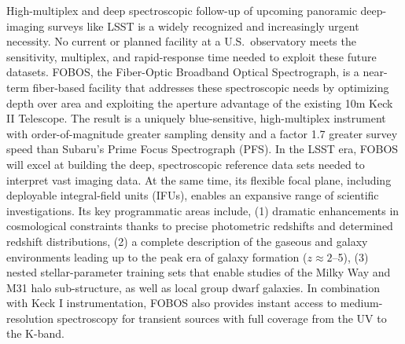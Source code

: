 \documentclass[oneside,12pt]{amsart}
\begin{document}
\noindent High-multiplex and deep spectroscopic follow-up of upcoming
panoramic deep-imaging surveys like LSST is a widely recognized and
increasingly urgent necessity. No current or planned facility at a
U.S.~observatory meets the sensitivity, multiplex, and rapid-response
time needed to exploit these future datasets. FOBOS, the Fiber-Optic
Broadband Optical Spectrograph, is a near-term fiber-based facility that
addresses these spectroscopic needs by optimizing depth over area and
exploiting the aperture advantage of the existing 10m Keck II Telescope.
The result is a uniquely blue-sensitive, high-multiplex instrument with
order-of-magnitude greater sampling density and a factor 1.7 greater
survey speed than Subaru's Prime Focus Spectrograph (PFS). In the LSST
era, FOBOS will excel at building the deep, spectroscopic reference data
sets needed to interpret vast imaging data. At the same time, its
flexible focal plane, including deployable integral-field units (IFUs),
enables an expansive range of scientific investigations. Its key
programmatic areas include, (1) dramatic enhancements in cosmological
constraints thanks to precise photometric redshifts and determined
redshift distributions, (2) a complete description of the gaseous and
galaxy environments leading up to the peak era of galaxy formation ($z
\approx 2$--5), (3) nested stellar-parameter training sets that enable
studies of the Milky Way and M31 halo sub-structure, as well as local group dwarf galaxies.  In combination with Keck I
instrumentation, FOBOS also provides instant access to medium-resolution spectroscopy for transient sources with full
coverage from the UV to the K-band.

\pagebreak















\clearpage
\begin{multicols}{2}
\scriptsize


\end{multicols}

\end{document}
